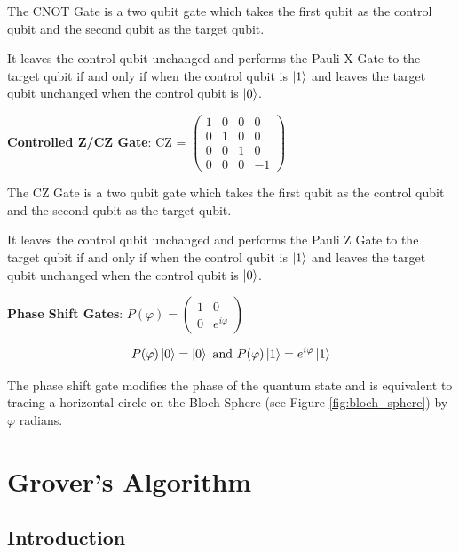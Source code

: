 \documentclass{article}
\begin{document}
\noindent
The CNOT Gate is a two qubit gate which takes the first qubit as the control qubit and the second qubit as the target qubit.
\vspace{5mm}

\noindent
It leaves the control qubit unchanged and performs the Pauli X Gate to the target qubit if and only if when the control qubit is $\ket{1}$ and leaves the target qubit unchanged when the control qubit is $\ket{0}$.
\vspace{5mm}

\textbf{Controlled Z/CZ Gate}: \qquad CZ = $\begin{pmatrix} 1 & 0 & 0 & 0 \\ 0 & 1 & 0 & 0 \\ 0 & 0 & 1 & 0 \\ 0 & 0 & 0 & -1 \end{pmatrix}$
\vspace{5mm}

\noindent
The CZ Gate is a two qubit gate which takes the first qubit as the control qubit and the second qubit as the target qubit.
\vspace{5mm}

\noindent
It leaves the control qubit unchanged and performs the Pauli Z Gate to the target qubit if and only if when the control qubit is $\ket{1}$ and leaves the target qubit unchanged when the control qubit is $\ket{0}$.
\pagebreak

\textbf{Phase Shift Gates}: \qquad $ P(\varphi) = \begin{pmatrix} 1 & 0 \\ 0 & e^{i\varphi} \end{pmatrix}$ 
\vspace{5mm}

\begin{equation}
P(\varphi)\ket{0} = \ket{0} \ \text{and} \ P(\varphi)\ket{1} = e^{i\varphi}\ket{1} 
\end{equation}

\noindent
The phase shift gate modifies the phase of the quantum state and is equivalent to tracing a horizontal circle on the Bloch Sphere (see Figure \ref{fig:bloch_sphere}) by $\varphi$ radians\cite{noauthor_quantum_nodate}. 
\pagebreak






\section{Grover's Algorithm}
\subsection{Introduction}
\end{document}
